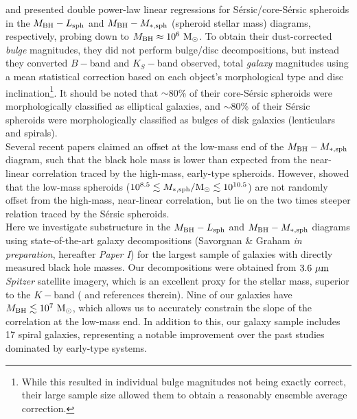 \documentclass[preprint2]{emulateapj}
\begin{document}
\cite{grahamscott2013} and \cite{scott2013} presented double power-law linear regressions 
for S\'ersic/core-S\'ersic spheroids in the $M_{\rm BH} - L_{\rm sph}$ and $M_{\rm BH} - M_{\rm *,sph}$ 
(spheroid stellar mass) diagrams, respectively, probing down to $M_{\rm BH} \approx 10^6\rm~M_\odot$. 
To obtain their dust-corrected \emph{bulge} magnitudes, they did not perform bulge/disc decompositions, 
but instead they converted $B-$band and $K_S-$band observed, total \emph{galaxy} magnitudes 
using a mean statistical correction based on each object's morphological type and disc 
inclination\footnote{While this resulted in individual bulge magnitudes not being exactly correct, 
their large sample size allowed them to obtain a reasonably ensemble average correction.}. 
It should be noted that $\sim$80\% of their core-S\'ersic spheroids were morphologically classified as elliptical galaxies, 
and $\sim$80\% of their S\'ersic spheroids were morphologically classified as bulges of disk galaxies (lenticulars and spirals). \\
Several recent papers \citep{jiang2011a,jiang2013,mathur2012,reines2013} claimed an offset at the low-mass end of the $M_{\rm BH} - M_{\rm *,sph}$ diagram,
such that the black hole mass is lower than expected from the near-linear correlation traced by the high-mass, early-type spheroids. 
However, \cite{grahamscott2015} showed that the low-mass spheroids ($10^{8.5} \lesssim M_{\rm *,sph}/{\rm M_\odot} \lesssim 10^{10.5}$) 
are not randomly offset from the high-mass, near-linear correlation, 
but lie on the two times steeper relation traced by the S\'ersic spheroids. \\
Here we investigate substructure in the $M_{\rm BH} - L_{\rm sph}$ and $M_{\rm BH} - M_{\rm *,sph}$ diagrams 
using state-of-the-art galaxy decompositions (Savorgnan \& Graham \emph{in preparation}, hereafter \emph{Paper I}) 
for the largest sample of galaxies with directly measured black hole masses.
Our decompositions were obtained from $3.6\rm~\mu m$ \emph{Spitzer} satellite imagery, 
which is an excellent proxy for the stellar mass, superior to the $K-$band (\citealt{sheth2010} and references therein).
Nine of our galaxies have $M_{\rm BH} \lesssim 10^7\rm~M_\odot$, 
which allows us to accurately constrain the slope of the correlation at the low-mass end.
In addition to this, our galaxy sample includes 17 spiral galaxies, 
representing a notable improvement over the past studies dominated by early-type systems.
\end{document}
